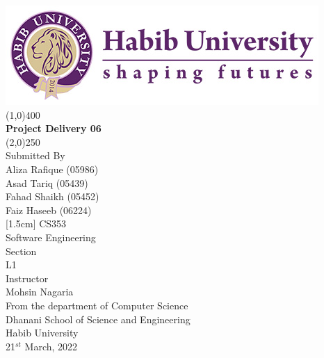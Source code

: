\begin{titlepage}
\thispagestyle{empty}
\begin{center}
\includegraphics[scale=0.40]{Figures/HU-LOGO--01.jpg}
\line(1,0){400}\\
[2mm]
\selectfont
\textbf{Project Delivery 06}\\
\line(2,0){250}\\
[0.5cm]
Submitted By\\
Aliza Rafique (05986)\\
Asad Tariq (05439)\\
Fahad Shaikh (05452)\\
Faiz Haseeb (06224)\\
[1.5cm]
CS353\\
Software Engineering\\ 
[1.0cm]
Section\\
L1\\
[1.0cm]
Instructor\\
Mohsin Nagaria\\
[1.5cm]
From the department of Computer Science\\
Dhanani School of Science and Engineering\\
Habib University\\
21$^{st}$ March, 2022
\end{center} 
\end{titlepage}